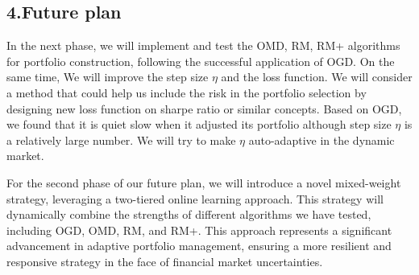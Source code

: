\documentclass[]{report}
\begin{document}
\subsection*{4.Future plan}
In the next phase, we will implement and test the OMD, RM, RM+ algorithms for portfolio construction, following the successful application of OGD. On the same time, We will improve the step size $\eta$ and the loss function. We will consider a method that could help us include the risk in the portfolio selection by designing new loss function on sharpe ratio or similar concepts. Based on OGD, we found that it is quiet slow when it adjusted its portfolio although step size $\eta$ is a relatively large number. We will try to make $\eta$ auto-adaptive in the dynamic market.

For the second phase of our future plan, we will introduce a novel mixed-weight strategy, leveraging a two-tiered online learning approach. This strategy will dynamically combine the strengths of different algorithms we have tested, including OGD, OMD, RM, and RM+.  This approach represents a significant advancement in adaptive portfolio management, ensuring a more resilient and responsive strategy in the face of financial market uncertainties.

\printbibliography
\end{document}
